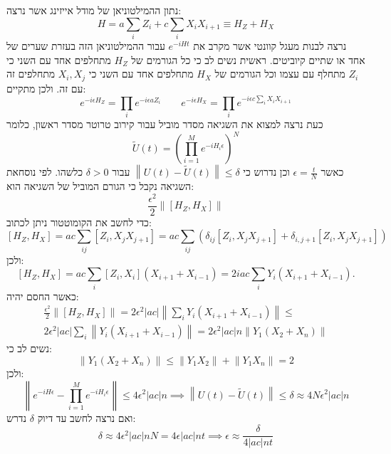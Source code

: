 \documentclass{tstextbook}
\begin{document}
\begin{example}
נתון ההמילטוניאן של מודל אייזינג אשר נרצה:
$$H=a{\sum_{i}}Z_{i}+c{\sum_{i}}X_{i}X_{i+1}\equiv H_{Z}+H_{X}$$
נרצה לבנות מעגל קוונטי אשר מקרב את \(e^{ -iHt }\) עבור ההמילטוניאן הזה בעזרת שערים של אחד או שתיים קיוביטים. ראשית נשים לב כי כל הגורמים של \(H_{Z}\) מתחלפים אחד עם השני כי \(Z_{i}\) מתחלף עם עצמו וכל הגורמים של \(H_{X}\) מתחלפים אחד עם השני כי \(X_{i},X_{j}\) מתחלפים זה עם זה. ולכן מתקיים:
$$e^{ -i\epsilon H_{Z} }=\prod_{i}e^{ -i\epsilon aZ_{i}}\qquad e^{ -i\epsilon H_{X} }=\prod_{i}e^{ -i\epsilon c\sum_{i}X_{i}X_{i+1} }$$
כעת נרצה למצוא את השגיאה מסדר מוביל עבור קירוב טרוטר מסדר ראשון, כלומר $$\widetilde{U}\left(t\right)=\left(\prod_{i=1}^{M}e^{-i H_{i}\epsilon}\right)^{N}$$ כאשר \(\epsilon=\frac{t}{N}\) וכן נדרוש כי \(\left\lVert  U(t)-\tilde{U}(t)  \right\rVert\leq \delta\) עבור \(\delta> 0\) כלשהו. לפי נוסחאת השגיאה נקבל כי הגורם המוביל של השגיאה הוא:
$$\frac{\epsilon^{2}}{2}\left\|\left[H_{Z},H_{X}\right]\right\|$$
כדי לחשב את הקומוטטור ניתן לכתוב:
$$[H_{Z},H_{X}]=a c{\sum_{i j}{\left[Z_{i},X_{j}X_{j+1}\right]}}=a c{\sum_{i j}{\left(\delta_{i j}\left[Z_{i},X_{j}X_{j+1}\right]+\delta_{i,j+1}\left[Z_{i},X_{j}X_{j+1}\right]\right)}}$$
ולכן:
$$\left[H_{Z},H_{X}\right]=a c{\sum_{i}\left[Z_{i},X_{i}\right]\left(X_{i+1}+X_{i-1}\right)}=2i a c{\sum_{i}}Y_{i}\left(X_{i+1}+X_{i-1}\right).$$
כאשר החסם יהיה:
$$\begin{gather}\frac{\epsilon^{2}}{2}\left\|\left[H_{Z},H_{X}\right]\right\|=2\epsilon^{2}\left|a c\right|\left\|\sum_{i}Y_{i}\left(X_{i+1}+X_{i-1}\right)\right\|\leq\\ 2\epsilon^{2}\left|a c\right|\sum_{i}\left\|Y_{i}\left(X_{i+1}+X_{i-1}\right)\right\|{=}2\epsilon^{2}\left|a c\right|n\left\|Y_{1}\left(X_{2}{+}X_{n}\right)\right\| 
\end{gather}$$
נשים לב כי:
$$\left\|Y_{1}\left(X_{2}+X_{n}\right)\right\|\leq\left\|Y_{1}X_{2}\right\|+\left\|Y_{1}X_{n}\right\|=2$$
ולכן:
$$\left\|e^{-i H\epsilon}-\prod_{i=1}^{M}e^{-i H_{i}\epsilon}\right\|\leq4\epsilon^{2}\left|a c\right|n\implies \left\|U\left(t\right)-\widetilde{U}\left(t\right)\right\|\leq\delta\approx4N\epsilon^{2}\left|a c\right|n$$
ואם נרצה לחשב עד דיוק \(\delta\) נדרש:
$$\delta\approx4\epsilon^{2}\left|a c\right|n N=4\epsilon\left|a c\right|n t\implies\epsilon\approx\frac{\delta}{4\left|a c\right|n t}$$

\end{example}
\end{document}
